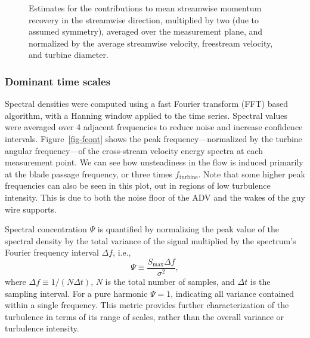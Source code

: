 \begin{figure}
    \centering
    
    
    \caption{Estimates for the contributions to mean streamwise momentum
        recovery in the streamwise direction, multiplied by two (due to assumed
        symmetry), averaged over the measurement plane, and normalized by the
        average streamwise velocity, freestream velocity, and turbine diameter.}
    
    \label{fig-mombargraph}
\end{figure}


\subsubsection{Dominant time scales}

Spectral densities were computed using a fast Fourier transform (FFT) based
algorithm, with a Hanning window applied to the time series. Spectral values
were averaged over 4 adjacent frequencies to reduce noise and increase
confidence intervals. Figure~\ref{fig-fcont} shows the peak
frequency---normalized by the turbine angular frequency---of the cross-stream
velocity energy spectra at each measurement point. We can see how unsteadiness
in the flow is induced primarily at the blade passage frequency, or three times
$f_\mathrm{turbine}$. Note that some higher peak frequencies can also be seen in
this plot, out in regions of low turbulence intensity. This is due to both the
noise floor of the ADV and the wakes of the guy wire supports.

Spectral concentration $\Psi$ is quantified by normalizing the peak value of the
spectral density by the total variance of the signal multiplied by the
spectrum's Fourier frequency interval $\Delta f$, i.e.,
\begin{equation}
    \Psi \equiv \frac{S_{\max} \Delta f}{\sigma^2},
    \label{eq-spec_cont}
\end{equation}
where $\Delta f \equiv 1/(N \Delta t)$, $N$ is the total number of samples, and
$\Delta t$ is the sampling interval. For a pure harmonic $\Psi = 1$, indicating
all variance contained within a single frequency. This metric provides further
characterization of the turbulence in terms of its range of scales, rather than
the overall variance or turbulence intensity.

